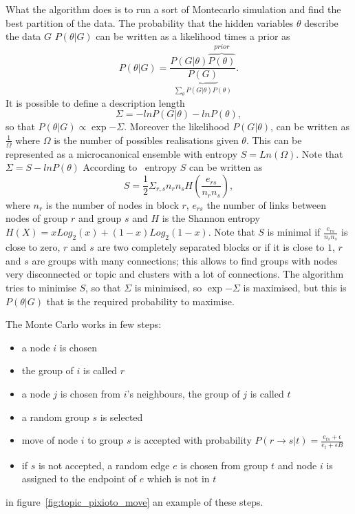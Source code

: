 What the algorithm does is to run a sort of Montecarlo simulation and find the best partition of the data.
The probability that the hidden variables $\theta$ describe the data $G$ $P(\theta | G)$ can be written as a likelihood times a prior as 
\[P(\theta|G)=\frac{P(G|\theta)\overbrace{P(\theta)}^{prior}}{\underbrace{P(G)}_{\sum_{\theta}P(G|\theta)P(\theta)}}.\]
It is possible to define a description length
\[
\Sigma=-lnP(G|\theta)-lnP(\theta),
\]
so that $P(\theta | G)\propto \exp{-\Sigma}$.
Moreover the likelihood $P(G | \theta)$, can be written as $\frac{1}{\Omega}$ where $\Omega$ is the number of possibles realisations given $\theta$. This can be represented as a microcanonical ensemble with entropy $S=Ln\left(\Omega\right)$.
Note that $\Sigma=S-lnP(\theta)$
According to~\cite{peixoto2017nonparametric} entropy $S$ can be written as
\[
S=\frac{1}{2}\Sigma_{r,s} n_rn_sH\left(\frac{e_{rs}}{n_rn_s}\right),
\]
where $n_r$ is the number of nodes in block $r$, $e_{rs}$ the number of links between nodes of group $r$ and group $s$ and $H$ is the Shannon entropy $H(X)=xLog_2(x)+(1-x)Log_2(1-x)$. Note that $S$ is minimal if $\frac{e_{rs}}{n_rn_s}$ is close to zero, $r$ and $s$ are two completely separated blocks or if it is close to $1$, $r$ and $s$ are groups with many connections; this allows to find groups with nodes very disconnected or topic and clusters with a lot of connections.
The algorithm tries to minimise $S$, so that $\Sigma$ is minimised, so $\exp{-\Sigma}$ is maximised, but this is $P(\theta | G)$ that is the required probability to maximise.

The Monte Carlo works in few steps:
\begin{itemize}
 \item a node $i$ is chosen
 \item the group of $i$ is called $r$
  \item a node $j$ is chosen from $i$'s neighbours, the group of $j$ is called $t$
  \item a random group $s$ is selected
  \item move of node $i$ to group $s$ is accepted with probability $P(r\to s|t)=\frac{e_{ts}+\epsilon}{e_t+\epsilon B}$
  \item if $s$ is not accepted, a random edge $e$ is chosen from group $t$ and node $i$ is assigned to the endpoint of $e$ which is not in $t$
\end{itemize}
in figure~\ref{fig:topic_pixioto_move} an example of these steps.

